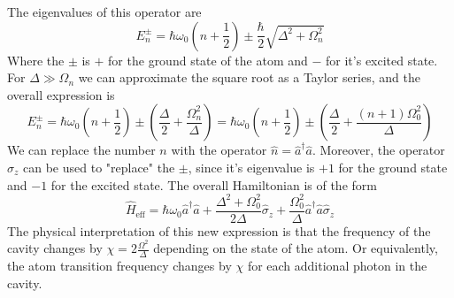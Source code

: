 The eigenvalues of this operator are
\[
    E_n^\pm = \hbar \omega_0 (n + \frac{1}{2}) \pm \frac{\hbar}{2}\sqrt{\Delta^2 +\Omega_n^2}
\]
Where the $\pm$ is $+$ for the ground state of the atom and $-$ for it's excited state. For $\Delta \gg \Omega_n$ we can approximate the square root as a Taylor series, and the overall expression is
\[
    E_n^\pm = \hbar \omega_0 (n + \frac{1}{2}) \pm (\frac{\Delta}{2} + \frac{\Omega_n^2}{\Delta}) =  \hbar \omega_0 (n + \frac{1}{2}) \pm (\frac{\Delta}{2} + \frac{ (n+1)\Omega_0^2}{\Delta})
\]
We can replace the number $n$ with the operator $\hat{n} = \hat{a}^\dag \hat{a}$. Moreover, the operator $\hat{\sigma}_z$ can be used to "replace" the $\pm$, since it's eigenvalue is $+1$ for the ground state and $-1$ for the excited state. The overall Hamiltonian is of the form
\begin{equation} \label{eq:dispersive-hamiltonian}
    \hat{H}_{\text{eff}} = \hbar \omega_0 \hat{a}^\dag \hat{a} + \frac{\Delta^2 + \Omega_0^2}{2\Delta}\hat{\sigma}_z + \frac{\Omega_0^2}{\Delta} \hat{a}^\dag \hat{a} \hat{\sigma}_z
\end{equation}
The physical interpretation of this new expression is that the frequency of the cavity changes by $\chi = 2\frac{\Omega^2}{\Delta}$ depending on the state of the atom. Or equivalently, the atom transition frequency changes by $\chi$ for each additional photon in the cavity.



